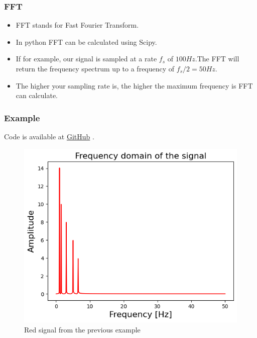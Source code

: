 \documentclass{beamer}
\newcommand{\github}{
\href{https://github.com/A-M-Kharazi/Machine-Learning-TMU}{GitHub}
}
\begin{document}
	\begin{frame}
		\frametitle{FFT}
		\begin{itemize}
			\item 
			FFT stands for Fast Fourier Transform.
			
			\item
			In python FFT can be calculated using Scipy.
			
			\item
			If for example,  our signal is sampled at a rate $f_s$ of $100 Hz$.The FFT will return the frequency spectrum up to a frequency of $f_s / 2 = 50 Hz$.

			
			\item
			
			The higher your sampling rate is, the higher the maximum frequency is FFT can calculate.
			
		\end{itemize}
	\end{frame}
	
	\begin{frame}
		\frametitle{Example}
		
		Code is available at \github.
		
		\begin{center}
			\begin{figure}\label{fig3}
				\includegraphics[scale=0.45]{fft_of_signal.png}
				\caption{Red signal from the previous example}
			\end{figure}
		\end{center}
		
	\end{frame}
\end{document}
